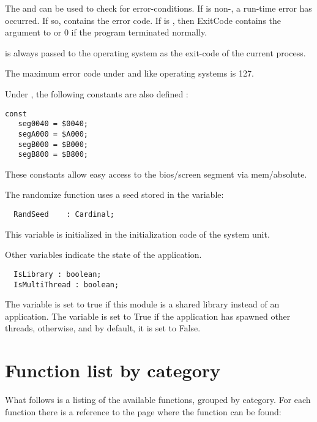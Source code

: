 
The  and  can be used to check for
error-conditions. If  is non-, a run-time error has
occurred. If so,  contains the error code. If  is
, then {ExitCode} contains the argument to  or 0 if the
program terminated normally.

 is always passed to the operating system as the exit-code of
the current process.

\begin{remark}
The maximum error code under \linux and \unix like operating systems is 127.
\end{remark}

Under , the following constants are also defined :
\begin{verbatim}
const
   seg0040 = $0040;
   segA000 = $A000;
   segB000 = $B000;
   segB800 = $B800;
\end{verbatim}
These constants allow easy access to the bios/screen segment via mem/absolute.

The randomize function uses a seed stored in the  variable:
\begin{verbatim}
  RandSeed    : Cardinal;
\end{verbatim}
This variable is initialized in the initialization code of the system unit.

Other variables indicate the state of the application.
\begin{verbatim}
  IsLibrary : boolean;
  IsMultiThread : boolean;
\end{verbatim}
The  variable is set to true if this module is a
shared library instead of an application. The 
variable is set to True if the application has spawned other
threads, otherwise, and by default, it is set to False.

\section{Function list by category}
What follows is a listing of the available functions, grouped by category.
For each function there is a reference to the page where the
function can be found:
